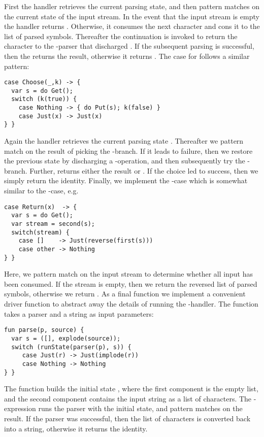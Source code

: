 First the handler retrieves the current parsing state, and then pattern matches on the current state of the input stream. In the event that the input stream is empty the handler returns . Otherwise, it consumes the next character  and cons it to the list of parsed symbols. Thereafter the continuation is invoked to return the character  to the -parser that discharged .
If the subsequent parsing is successful, then the  returns  the result, otherwise it returns .
The case for  follows a similar pattern:
\begin{lstlisting}[style=links]
case Choose(_,k) -> {
  var s = do Get();
  switch (k(true)) {
    case Nothing -> { do Put(s); k(false) }
    case Just(x) -> Just(x)
} }
\end{lstlisting}
Again the handler retrieves the current parsing state . Thereafter we pattern match on the result of picking the -branch. If it leads to failure, then we restore the previous state  by discharging a -operation, and then subsequently try the -branch. Further,  returns either  the result or . If the choice led to success, then we simply return the identity.
Finally, we implement the -case which is somewhat similar to the -case, e.g.
\begin{lstlisting}[style=links]
case Return(x)  -> {
  var s = do Get();
  var stream = second(s);
  switch(stream) {
    case []    -> Just(reverse(first(s)))
    case other -> Nothing
} }
\end{lstlisting}
Here, we pattern match on the input stream to determine whether all input has been consumed. If the stream is empty, then we return  the reversed list of parsed symbols, otherwise we return . As a final function we implement a convenient driver function  to abstract away the details of running the -handler. The  function takes a parser  and a string  as input parameters:
\begin{lstlisting}[style=links]
fun parse(p, source) {
  var s = ([], explode(source));
  switch (runState(parser(p), s)) {
     case Just(r) -> Just(implode(r))
     case Nothing -> Nothing
} }
\end{lstlisting}
The function builds the initial state , where the first component is the empty list, and the second component contains the input string as a list of characters. The -expression runs the parser with the initial state, and pattern matches on the result. If the parser was successful, then the list of characters is converted back into a string, otherwise it returns the identity.

